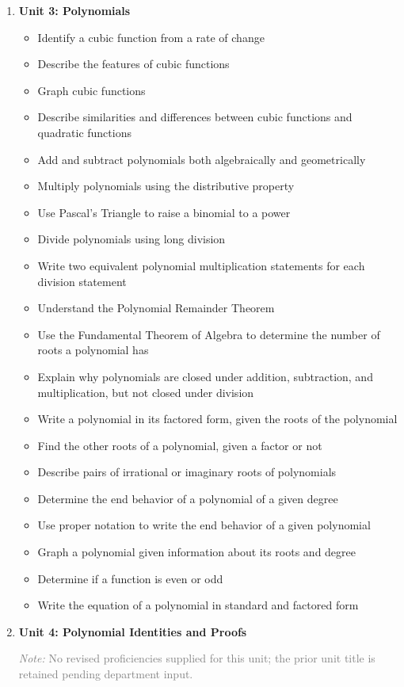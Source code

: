 \documentclass[11pt]{article}
\newcommand{\was}[1]{\newline{\small\textcolor{gray}{\textit{was:} #1}}}
\newcommand{\revnote}[1]{\par\medskip
  {\small\textcolor{gray}{\textit{Note:} #1}}}
\begin{document}
\begin{enumerate}[itemsep=6pt]
\item \textbf{Unit 3: Polynomials}
      \was{Unit 3: Rational Functions}
  \begin{itemize}[nosep,leftmargin=1.5em]
  \item Identify a cubic function from a rate of change
  \item Describe the features of cubic functions
  \item Graph cubic functions
  \item Describe similarities and differences between cubic functions and quadratic
        functions
  \item Add and subtract polynomials both algebraically and geometrically
  \item Multiply polynomials using the distributive property
  \item Use Pascal's Triangle to raise a binomial to a power
  \item Divide polynomials using long division
  \item Write two equivalent polynomial multiplication statements for each division
        statement
  \item Understand the Polynomial Remainder Theorem
  \item Use the Fundamental Theorem of Algebra to determine the number of roots a
        polynomial has
  \item Explain why polynomials are closed under addition, subtraction, and
        multiplication, but not closed under division
  \item Write a polynomial in its factored form, given the roots of the polynomial
  \item Find the other roots of a polynomial, given a factor or not
  \item Describe pairs of irrational or imaginary roots of polynomials
  \item Determine the end behavior of a polynomial of a given degree
  \item Use proper notation to write the end behavior of a given polynomial
  \item Graph a polynomial given information about its roots and degree
  \item Determine if a function is even or odd
  \item Write the equation of a polynomial in standard and factored form
  \end{itemize}

\item \textbf{Unit 4: Polynomial Identities and Proofs}
      \revnote{No revised proficiencies supplied for this unit; the prior unit title is
        retained pending department input.}


\end{enumerate}
\end{document}
